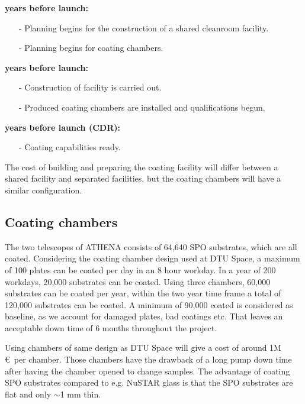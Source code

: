 \begin{description}[itemsep=1.5pt,parsep=1pt]
	\item[9] \textbf{years before launch:}
		\begin{itemize}[itemsep=1.5pt,parsep=1pt]
		\item[-] Planning begins for the construction of a shared cleanroom facility.
		\item[-] Planning begins for coating chambers.
		\end{itemize}
	\item[7-8] \textbf{years before launch:}
		\begin{itemize}[itemsep=1.5pt,parsep=1pt]
		\item[-] Construction of facility is carried out.
		\item[-] Produced coating chambers are installed and qualifications begun.
		\end{itemize}
	\item[6] \textbf{years before launch (CDR):}
		\begin{itemize}[itemsep=1.5pt,parsep=1pt]
		\item[-] Coating capabilities ready.
		\end{itemize}
\end{description}

The cost of building and preparing the coating facility will differ between a shared facility and separated facilities, but the coating chambers will have a similar configuration.

\subsection{Coating chambers}\label{sec:chambers}
The two telescopes of ATHENA consists of 64,640 SPO substrates, which are all coated. Considering the coating chamber design used at DTU Space, a maximum of 100 plates can be coated per day in an 8 hour workday. In a year of 200 workdays, 20,000 substrates can be coated. Using three chambers, 60,000 substrates can be coated per year, within the two year time frame a total of 120,000 substrates can be coated. A minimum of 90,000 coated is considered as baseline, as we account for damaged plates, bad coatings etc. That leaves an acceptable down time of 6 months throughout the project.

Using chambers of same design as DTU Space will give a cost of around 1M \euro\ per chamber. Those chambers have the drawback of a long pump down time after having the chamber opened to change samples. The advantage of coating SPO substrates compared to e.g. NuSTAR glass is that the SPO substrates are flat and only $\sim$1 mm thin.

